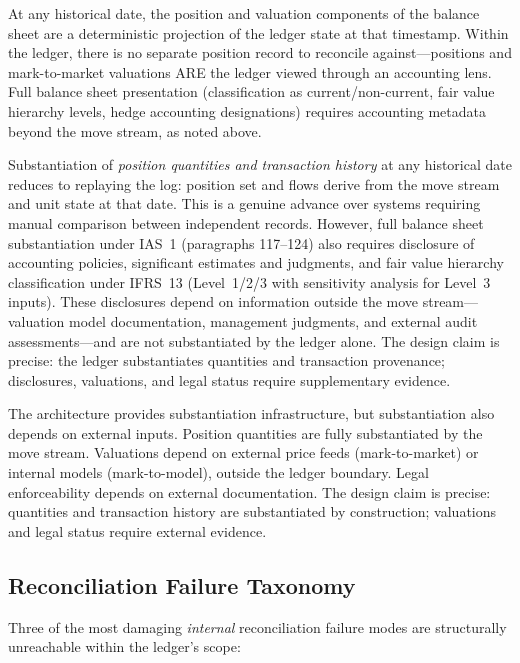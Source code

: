\documentclass[11pt,a4paper]{article}
\begin{document}
At any historical date, the position and valuation components of the balance sheet are a deterministic projection of the ledger state at that timestamp. Within the ledger, there is no separate position record to reconcile against---positions and mark-to-market valuations ARE the ledger viewed through an accounting lens. Full balance sheet presentation (classification as current/non-current, fair value hierarchy levels, hedge accounting designations) requires accounting metadata beyond the move stream, as noted above.

Substantiation of \emph{position quantities and transaction history} at any historical date reduces to replaying the log: position set and flows derive from the move stream and unit state at that date. This is a genuine advance over systems requiring manual comparison between independent records. However, full balance sheet substantiation under IAS~1 (paragraphs 117--124) also requires disclosure of accounting policies, significant estimates and judgments, and fair value hierarchy classification under IFRS~13 (Level~1/2/3 with sensitivity analysis for Level~3 inputs). These disclosures depend on information outside the move stream---valuation model documentation, management judgments, and external audit assessments---and are not substantiated by the ledger alone. The design claim is precise: the ledger substantiates quantities and transaction provenance; disclosures, valuations, and legal status require supplementary evidence.

The architecture provides substantiation infrastructure, but substantiation also depends on external inputs. Position quantities are fully substantiated by the move stream. Valuations depend on external price feeds (mark-to-market) or internal models (mark-to-model), outside the ledger boundary. Legal enforceability depends on external documentation. The design claim is precise: quantities and transaction history are substantiated by construction; valuations and legal status require external evidence.

\subsection{Reconciliation Failure Taxonomy}

Three of the most damaging \emph{internal} reconciliation failure modes are structurally unreachable within the ledger's scope:
\end{document}
